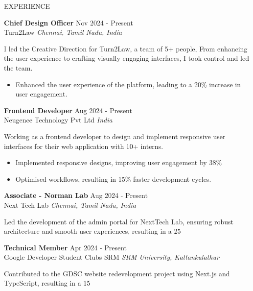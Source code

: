 \documentclass{resume}
\begin{document}
\vspace{1.5em}


\begin{rSection}{EXPERIENCE}

\textbf{Chief Design Officer} \hfill Nov 2024 - Present\\
Turn2Law \hfill \textit{Chennai, Tamil Nadu, India}

I led the Creative Direction for Turn2Law, a team of 5+ people, From enhancing the user experience to crafting visually engaging interfaces, I took control and led the team.

\begin{itemize}
\item Enhanced the user experience of the platform, leading to a 20\% increase in user engagement.
\end{itemize}
\textbf{Frontend Developer} \hfill Aug 2024 - Present\\
Neugence Technology Pvt Ltd \hfill \textit{India}

Working as a frontend developer to design and implement responsive user interfaces for their web application with 10+ interns.

\begin{itemize}
\item Implemented responsive designs, improving user engagement by 38\%
\item Optimised workflows, resulting in 15\% faster development cycles.
\end{itemize}
\textbf{Associate - Norman Lab} \hfill Aug 2024 - Present\\
Next Tech Lab \hfill \textit{Chennai, Tamil Nadu, India}

Led the development of the admin portal for NextTech Lab, ensuring robust architecture and smooth user experiences, resulting in a 25%

\textbf{Technical Member} \hfill Apr 2024 - Present\\
Google Developer Student Clubs SRM \hfill \textit{SRM University, Kattankulathur}

Contributed to the GDSC website redevelopment project using Next.js and TypeScript, resulting in a 15%


\end{rSection}
\end{document}
